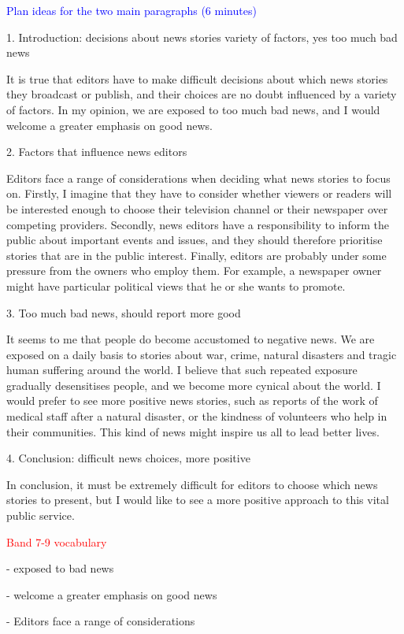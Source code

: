 \documentclass[12pt,a4paper]{article}
\newcommand{\textred}[1]{\textcolor{red}{#1}}  %
\newcommand{\textblue}[1]{\textcolor{blue}{#1}}  %
\newcommand{\upmean}[1]{\raisebox{0.25ex}{\scriptsize #1}}
\begin{document}
\textblue{Plan ideas for the two main paragraphs (6 minutes)}

1. Introduction: decisions about news stories
variety of factors, yes too much bad news

It is true that editors have to make difficult decisions about which news stories they broadcast or publish, 
and their choices are no doubt influenced by a variety of factors. 
In my opinion, we are exposed to too much bad news, and I would welcome a greater emphasis on good news.

2. Factors that influence news editors

Editors face a range of considerations when deciding what news stories to focus on. 
Firstly, I imagine that they have to consider whether viewers or readers will be interested enough to choose their television channel or their newspaper over competing providers. 
Secondly, news editors have a responsibility to inform the public about important events and issues, and they should therefore prioritise stories that are in the public interest. 
Finally, editors are probably under some pressure from the owners who employ them. For example, a newspaper owner might have particular political views that he or she wants to promote.

3. Too much bad news, should report more good

It seems to me that people do become accustomed to negative news. 
We are exposed on a daily basis to stories about war, crime, natural disasters and tragic human suffering around the world. 
I believe that such repeated exposure gradually desensitises people, and we become more cynical about the world. 
I would prefer to see more positive news stories, such as reports of the work of medical staff after a natural disaster, or the kindness of volunteers who help in their communities. 
This kind of news might inspire us all to lead better lives.

4. Conclusion: difficult news choices, more positive

In conclusion, it must be extremely difficult for editors to choose which news stories to present, 
but I would like to see a more positive approach to this vital public service.

\textred{Band 7-9 vocabulary}

- exposed to bad news

- welcome a greater emphasis \upmean{n.强调,重点} on good news

- Editors face a range of considerations
\end{document}
